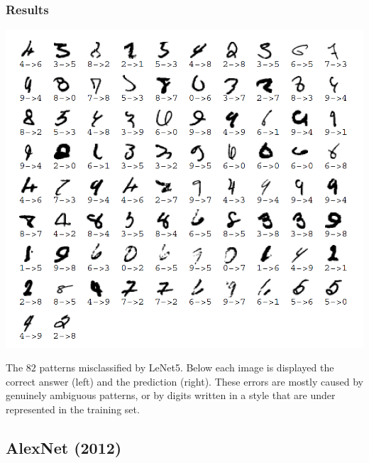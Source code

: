 \begin{frame}
	\frametitle{Results}

	\begin{center}
		\includegraphics[scale=0.5]{figs/Lenet_misclassified_digits}
	\end{center}

{\small The $82$ patterns misclassified by LeNet5. Below each image is displayed the correct answer (left) and the prediction (right). These errors are mostly caused by genuinely ambiguous patterns, or by digits written in a style that are under represented in the training set.}
\end{frame}











\subsection{AlexNet (2012)}

